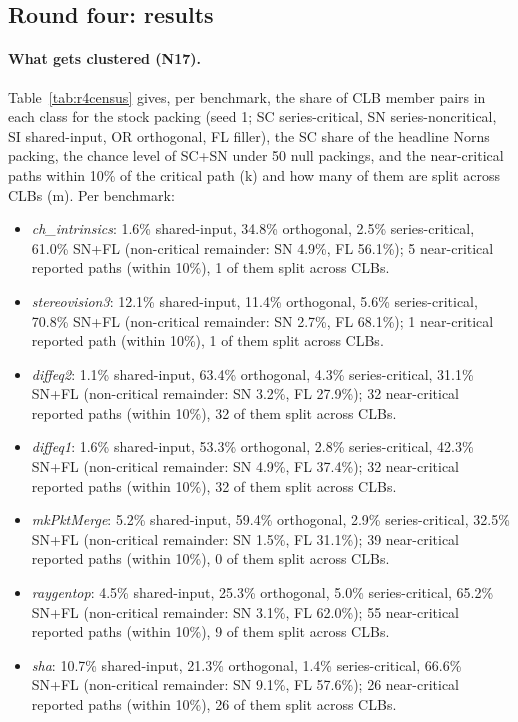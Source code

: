 
\subsection{Round four: results}
\label{sec:r4-results}
\paragraph{What gets clustered (N17).} Table~\ref{tab:r4census} gives, per benchmark, the share of CLB member pairs in each class for the stock packing
(seed 1; SC series-critical, SN series-noncritical, SI shared-input, OR orthogonal, FL filler), the SC share of the headline Norns packing, the chance level of
SC+SN under 50 null packings, and the near-critical paths within 10\% of the critical path (k) and how many of them are split across CLBs (m). Per benchmark:
\begin{itemize}\small
\item \emph{ch\_intrinsics}: 1.6\% shared-input, 34.8\% orthogonal, 2.5\% series-critical, 61.0\% SN+FL (non-critical remainder: SN 4.9\%, FL 56.1\%); 5 near-critical reported paths (within 10\%), 1 of them split across CLBs.
\item \emph{stereovision3}: 12.1\% shared-input, 11.4\% orthogonal, 5.6\% series-critical, 70.8\% SN+FL (non-critical remainder: SN 2.7\%, FL 68.1\%); 1 near-critical reported path (within 10\%), 1 of them split across CLBs.
\item \emph{diffeq2}: 1.1\% shared-input, 63.4\% orthogonal, 4.3\% series-critical, 31.1\% SN+FL (non-critical remainder: SN 3.2\%, FL 27.9\%); 32 near-critical reported paths (within 10\%), 32 of them split across CLBs.
\item \emph{diffeq1}: 1.6\% shared-input, 53.3\% orthogonal, 2.8\% series-critical, 42.3\% SN+FL (non-critical remainder: SN 4.9\%, FL 37.4\%); 32 near-critical reported paths (within 10\%), 32 of them split across CLBs.
\item \emph{mkPktMerge}: 5.2\% shared-input, 59.4\% orthogonal, 2.9\% series-critical, 32.5\% SN+FL (non-critical remainder: SN 1.5\%, FL 31.1\%); 39 near-critical reported paths (within 10\%), 0 of them split across CLBs.
\item \emph{raygentop}: 4.5\% shared-input, 25.3\% orthogonal, 5.0\% series-critical, 65.2\% SN+FL (non-critical remainder: SN 3.1\%, FL 62.0\%); 55 near-critical reported paths (within 10\%), 9 of them split across CLBs.
\item \emph{sha}: 10.7\% shared-input, 21.3\% orthogonal, 1.4\% series-critical, 66.6\% SN+FL (non-critical remainder: SN 9.1\%, FL 57.6\%); 26 near-critical reported paths (within 10\%), 26 of them split across CLBs.

\end{itemize}
